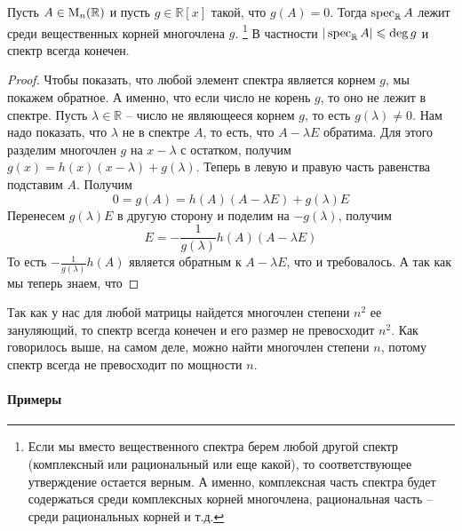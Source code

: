 \begin{claim}
\label{claim::SpecInRoots}
Пусть $A\in\operatorname{M}_{n}(\mathbb R)$ и пусть $g\in\mathbb R[x]$ такой, что $g(A) = 0$.
Тогда $\operatorname{spec}_\mathbb R A$ лежит среди вещественных корней многочлена $g$.%
\footnote{Если мы вместо вещественного спектра берем любой другой спектр (комплексный или рациональный или еще какой), то соответствующее утверждение остается верным.
А именно, комплексная часть спектра будет содержаться среди комплексных корней многочлена, рациональная часть -- среди рациональных корней и т.д.}
В частности $|\operatorname{spec}_\mathbb R A|\leqslant \deg g$ и спектр всегда конечен.
\end{claim}
\begin{proof}
Чтобы показать, что любой элемент спектра является корнем $g$, мы покажем обратное.
А именно, что если число не корень $g$, то оно не лежит в спектре.
Пусть $\lambda\in \mathbb R$ -- число не являющееся корнем $g$, то есть $g(\lambda) \neq 0$.
Нам надо показать, что $\lambda$ не в спектре $A$, то есть, что $A - \lambda E$ обратима.
Для этого разделим многочлен $g$ на $x - \lambda$ с остатком, получим $g(x) = h(x) (x-\lambda) + g(\lambda)$.
Теперь в левую и правую часть равенства подставим $A$.
Получим 
\[
0 = g(A) = h(A)(A - \lambda E) + g(\lambda)E
\]
Перенесем $g(\lambda)E$ в другую сторону и поделим на $-g(\lambda)$, получим
\[
E = -\frac{1}{g(\lambda)}h(A)(A-\lambda E)
\]
То есть $-\frac{1}{g(\lambda)}h(A)$ является обратным к $A-\lambda E$, что и требовалось.
А так как мы теперь знаем, что 
\end{proof}

Так как у нас для любой матрицы найдется многочлен степени $n^2$ ее зануляющий, то спектр всегда конечен и его размер не превосходит $n^2$.
Как говорилось выше, на самом деле, можно найти многочлен степени $n$, потому спектр всегда не превосходит по мощности $n$.

\paragraph{Примеры}

